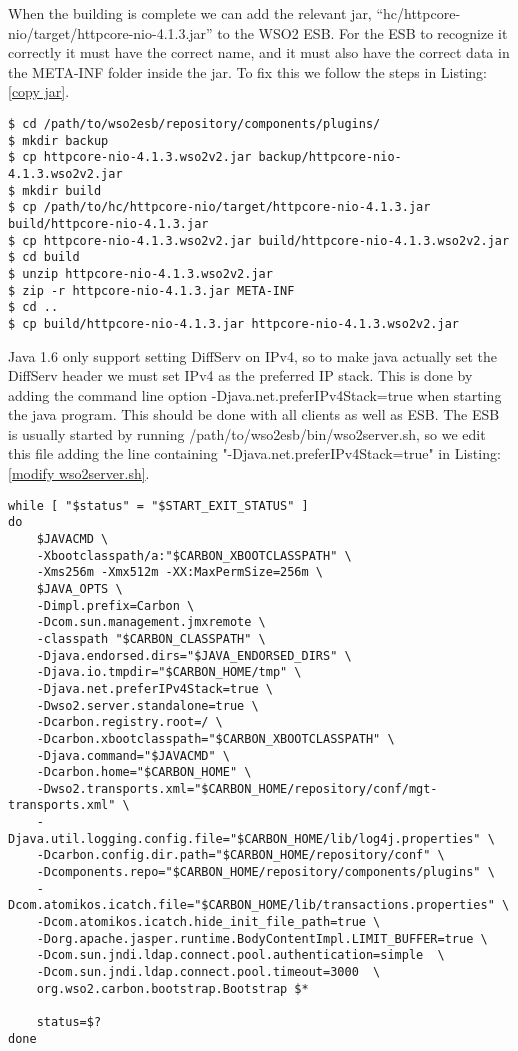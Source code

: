 	When the building is complete we can add the relevant jar, “hc/httpcore-nio/target/httpcore-nio-4.1.3.jar” to the WSO2 ESB. For the ESB to recognize it correctly it must have the correct name, and it must also have the correct data in the META-INF folder inside the jar. To fix this we follow the steps in Listing:\ref{copy jar}.
\begin{lstlisting}[frame=single, caption={Create WSO2 compatible jars}, label=copy jar, breaklines=true]
$ cd /path/to/wso2esb/repository/components/plugins/
$ mkdir backup
$ cp httpcore-nio-4.1.3.wso2v2.jar backup/httpcore-nio-4.1.3.wso2v2.jar
$ mkdir build
$ cp /path/to/hc/httpcore-nio/target/httpcore-nio-4.1.3.jar build/httpcore-nio-4.1.3.jar
$ cp httpcore-nio-4.1.3.wso2v2.jar build/httpcore-nio-4.1.3.wso2v2.jar
$ cd build
$ unzip httpcore-nio-4.1.3.wso2v2.jar
$ zip -r httpcore-nio-4.1.3.jar META-INF
$ cd ..
$ cp build/httpcore-nio-4.1.3.jar httpcore-nio-4.1.3.wso2v2.jar
\end{lstlisting}

	Java 1.6 only support setting DiffServ on IPv4, so to make java actually set the DiffServ header we must set IPv4 as the preferred IP stack. This is done by adding the command line option -Djava.net.preferIPv4Stack=true when starting the java program. This should be done with all clients as well as ESB. The ESB is usually started by running /path/to/wso2esb/bin/wso2server.sh, so we edit this file adding the line containing "-Djava.net.preferIPv4Stack=true" in Listing:\ref{modify wso2server.sh}.

\begin{lstlisting}[frame=single, caption={Changes made to wso2server.sh}, label=modify wso2server.sh, breaklines=true]
while [ "$status" = "$START_EXIT_STATUS" ]
do
    $JAVACMD \
    -Xbootclasspath/a:"$CARBON_XBOOTCLASSPATH" \
    -Xms256m -Xmx512m -XX:MaxPermSize=256m \
    $JAVA_OPTS \
    -Dimpl.prefix=Carbon \
    -Dcom.sun.management.jmxremote \
    -classpath "$CARBON_CLASSPATH" \
    -Djava.endorsed.dirs="$JAVA_ENDORSED_DIRS" \
    -Djava.io.tmpdir="$CARBON_HOME/tmp" \
    -Djava.net.preferIPv4Stack=true \
    -Dwso2.server.standalone=true \
    -Dcarbon.registry.root=/ \
    -Dcarbon.xbootclasspath="$CARBON_XBOOTCLASSPATH" \
    -Djava.command="$JAVACMD" \
    -Dcarbon.home="$CARBON_HOME" \
    -Dwso2.transports.xml="$CARBON_HOME/repository/conf/mgt-transports.xml" \
    -Djava.util.logging.config.file="$CARBON_HOME/lib/log4j.properties" \
    -Dcarbon.config.dir.path="$CARBON_HOME/repository/conf" \
    -Dcomponents.repo="$CARBON_HOME/repository/components/plugins" \
    -Dcom.atomikos.icatch.file="$CARBON_HOME/lib/transactions.properties" \
    -Dcom.atomikos.icatch.hide_init_file_path=true \
    -Dorg.apache.jasper.runtime.BodyContentImpl.LIMIT_BUFFER=true \
    -Dcom.sun.jndi.ldap.connect.pool.authentication=simple  \
    -Dcom.sun.jndi.ldap.connect.pool.timeout=3000  \
    org.wso2.carbon.bootstrap.Bootstrap $*

    status=$?
done
\end{lstlisting}


